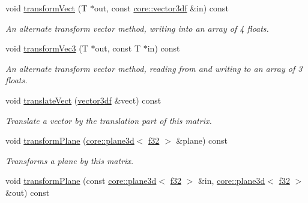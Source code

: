 \begin{DoxyCompactItemize}
void \hyperlink{classirr_1_1core_1_1CMatrix4_a1f23d4c668869f28c89d400518352879}{transform\+Vect} (T $\ast$out, const \hyperlink{namespaceirr_1_1core_ae6e2b2a6c552833ebbd5b7463d03586b}{core\+::vector3df} \&in) const
\begin{DoxyCompactList}\small\item\em An alternate transform vector method, writing into an array of 4 floats. \end{DoxyCompactList}\item 
\mbox{\label{classirr_1_1core_1_1CMatrix4_ab7a9dd4ba9f04fd5396dd116e8f5a1c0}} 
void \hyperlink{classirr_1_1core_1_1CMatrix4_ab7a9dd4ba9f04fd5396dd116e8f5a1c0}{transform\+Vec3} (T $\ast$out, const T $\ast$in) const
\begin{DoxyCompactList}\small\item\em An alternate transform vector method, reading from and writing to an array of 3 floats. \end{DoxyCompactList}\item 
\mbox{\label{classirr_1_1core_1_1CMatrix4_ac1b339a76eb0d2ce58dd69be896ed38a}} 
void \hyperlink{classirr_1_1core_1_1CMatrix4_ac1b339a76eb0d2ce58dd69be896ed38a}{translate\+Vect} (\hyperlink{namespaceirr_1_1core_ae6e2b2a6c552833ebbd5b7463d03586b}{vector3df} \&vect) const
\begin{DoxyCompactList}\small\item\em Translate a vector by the translation part of this matrix. \end{DoxyCompactList}\item 
\mbox{\label{classirr_1_1core_1_1CMatrix4_aa8324285dd538763f8e9cfa50cc04b62}} 
void \hyperlink{classirr_1_1core_1_1CMatrix4_aa8324285dd538763f8e9cfa50cc04b62}{transform\+Plane} (\hyperlink{classirr_1_1core_1_1plane3d}{core\+::plane3d}$<$ \hyperlink{namespaceirr_a0277be98d67dc26ff93b1a6a1d086b07}{f32} $>$ \&plane) const
\begin{DoxyCompactList}\small\item\em Transforms a plane by this matrix. \end{DoxyCompactList}\item 
\mbox{\label{classirr_1_1core_1_1CMatrix4_abba8dc0c37c86a50788066bba8dfb180}} 
void \hyperlink{classirr_1_1core_1_1CMatrix4_abba8dc0c37c86a50788066bba8dfb180}{transform\+Plane} (const \hyperlink{classirr_1_1core_1_1plane3d}{core\+::plane3d}$<$ \hyperlink{namespaceirr_a0277be98d67dc26ff93b1a6a1d086b07}{f32} $>$ \&in, \hyperlink{classirr_1_1core_1_1plane3d}{core\+::plane3d}$<$ \hyperlink{namespaceirr_a0277be98d67dc26ff93b1a6a1d086b07}{f32} $>$ \&out) const

\end{DoxyCompactItemize}
